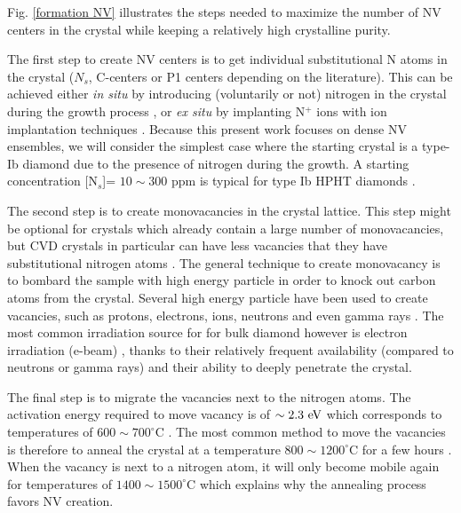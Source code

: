 \documentclass[a4paper,11pt]{report}
\begin{document}
Fig. \ref{formation NV} illustrates the steps needed to maximize the number of NV centers in the crystal while keeping a relatively high crystalline purity.

The first step to create NV centers is to get individual substitutional N atoms in the crystal ($N_s$, C-centers or P1 centers depending on the literature). This can be achieved either \textit{in situ} by introducing (voluntarily or not) nitrogen in the crystal during the growth process \citep{tallaire2006characterisation, lobaev2017influence}, or \textit{ex situ} by implanting N$^+$ ions with ion implantation techniques \citep{meijer2005generation, smith2019colour}. Because this present work focuses on dense NV ensembles, we will consider the simplest case where the starting crystal is a type-Ib diamond due to the presence of nitrogen during the growth. A starting concentration [N$_s$]= $10 \sim 300$ ppm is typical for type Ib HPHT diamonds \citep{achard2020chemical}.

The second step is to create monovacancies in the crystal lattice. This step might be optional for crystals which already contain a large number of monovacancies, but CVD crystals in particular can have less vacancies that they have substitutional nitrogen atoms \citep{mainwood1999point}. The general technique to create monovacancy is to bombard the sample with high energy particle in order to knock out carbon atoms from the crystal. Several high energy particle have been used to create vacancies, such as protons, electrons, ions, neutrons and even gamma rays \citep{davies1976optical, ashbaugh1988gemstone, kleinsasser2016high}. The most common irradiation source for for bulk diamond however is electron irradiation (e-beam) \citep{acosta2009diamonds}, thanks to their relatively frequent availability (compared to neutrons or gamma rays) and their ability to deeply penetrate the crystal.

The final step is to migrate the vacancies next to the nitrogen atoms. The activation energy required to move vacancy is of $\sim 2.3\ \rm eV$ which corresponds to temperatures of $600\sim 700 ^\circ$C \citep{davies1992vacancy, newton2002recombination}. The most common method to move the vacancies is therefore to anneal the crystal at a temperature $800 \sim 1200 ^\circ$C for a few hours \citep{botsoa2011optimal}. When the vacancy is next to a nitrogen atom, it will only become mobile again for temperatures of $1400 \sim 1500 ^\circ$C \citep{zaitsev2013optical, pinto2012diffusion} which explains why the annealing process favors NV creation.
\end{document}
